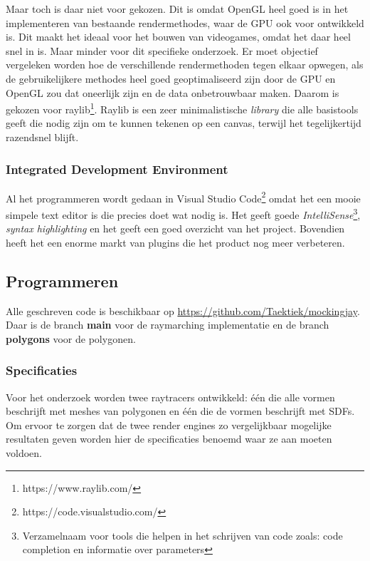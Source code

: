 \documentclass[12pt, a4paper]{article}
\begin{document}
Maar toch is daar niet voor gekozen. Dit is omdat OpenGL heel goed is in het implementeren van bestaande rendermethodes, waar de GPU ook voor ontwikkeld is. Dit maakt het ideaal voor het bouwen van videogames, omdat het daar heel snel in is. Maar minder voor dit specifieke onderzoek. Er moet objectief vergeleken worden hoe de verschillende rendermethoden tegen elkaar opwegen, als de gebruikelijkere methodes heel goed geoptimaliseerd zijn door de GPU en OpenGL zou dat oneerlijk zijn en de data onbetrouwbaar maken. Daarom is gekozen voor raylib\footnote{https://www.raylib.com/}. Raylib is een zeer minimalistische \emph{library} die alle basistools geeft die nodig zijn om te kunnen tekenen op een canvas, terwijl het tegelijkertijd razendsnel blijft. 
\subsubsection{Integrated Development Environment}
Al het programmeren wordt gedaan in Visual Studio Code\footnote{https://code.visualstudio.com/} omdat het een mooie simpele text editor is die precies doet wat nodig is. Het geeft goede \textit{IntelliSense}\footnote{Verzamelnaam voor tools die helpen in het schrijven van code zoals: code completion en informatie over parameters}, \textit{syntax highlighting} en het geeft een goed overzicht van het project. Bovendien heeft het een enorme markt van plugins die het product nog meer verbeteren.
\subsection{Programmeren}
Alle geschreven code is beschikbaar op \href{https://github.com/Taektiek/mockingjay}{https://github.com/Taektiek/mockingjay}. Daar is de branch \textbf{main} voor de raymarching implementatie en de branch \textbf{polygons} voor de polygonen.
\subsubsection{Specificaties}
Voor het onderzoek worden twee raytracers ontwikkeld: één die alle vormen beschrijft met meshes van polygonen en één die de vormen beschrijft met SDFs. Om ervoor te zorgen dat de twee render engines zo vergelijkbaar mogelijke resultaten geven worden hier de specificaties benoemd waar ze aan moeten voldoen.
\end{document}
